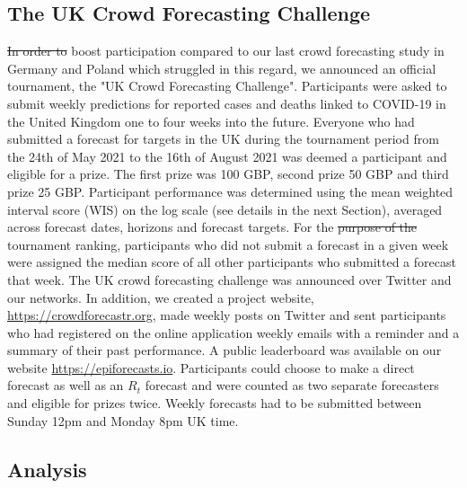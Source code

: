 \documentclass[10pt,a4paper,twocolumn]{article}
\providecommand{\DIFaddtex}[1]{{\protect\color{blue}\uwave{#1}}} %
\providecommand{\DIFdeltex}[1]{{\protect\color{red}\sout{#1}}}                      %
\providecommand{\DIFaddbegin}{} %
\providecommand{\DIFaddend}{} %
\providecommand{\DIFdelbegin}{} %
\providecommand{\DIFdelend}{} %
\providecommand{\DIFadd}[1]{\texorpdfstring{\DIFaddtex{#1}}{#1}} %
\providecommand{\DIFdel}[1]{\texorpdfstring{\DIFdeltex{#1}}{}} %
\begin{document}
\subsection*{The UK Crowd Forecasting Challenge}

\DIFdelbegin \DIFdel{In order to }\DIFdelend \DIFaddbegin \DIFadd{To }\DIFaddend boost participation compared to our last crowd forecasting study in Germany and Poland \citep{bosseComparingHumanModelbased2022} which struggled in this regard, we announced an official tournament, the "UK Crowd Forecasting Challenge". Participants were asked to submit weekly predictions for reported cases and deaths linked to COVID-19 in the United Kingdom one to four weeks into the future. Everyone who had submitted a forecast for targets in the UK during the tournament period from the 24th of May 2021 to the 16th of August 2021 was deemed a participant and eligible for a prize. The first prize was 100 GBP, second prize 50 GBP and third prize 25 GBP. Participant performance was determined using the mean weighted interval score (WIS) on the log scale (see details in the next Section), %
averaged across forecast dates, horizons and forecast targets. For the \DIFdelbegin \DIFdel{purpose of the }\DIFdelend tournament ranking, participants who did not submit a forecast in a given week were assigned the median score of all other participants who submitted a forecast that week. The UK crowd forecasting challenge was announced over Twitter and our networks. 
In addition, we created a project website, \url{https://crowdforecastr.org}, made weekly posts on Twitter and sent participants who had registered on the online application weekly emails with a reminder and a summary of their past performance. A public leaderboard was available on our website \url{https://epiforecasts.io}. Participants could choose to make a direct forecast as well as an $R_t$ forecast and were counted as two separate forecasters and eligible for prizes twice. Weekly forecasts had to be submitted between Sunday 12pm and Monday 8pm UK time. 


\subsection*{Analysis}
\label{sec:analysis}
\end{document}
